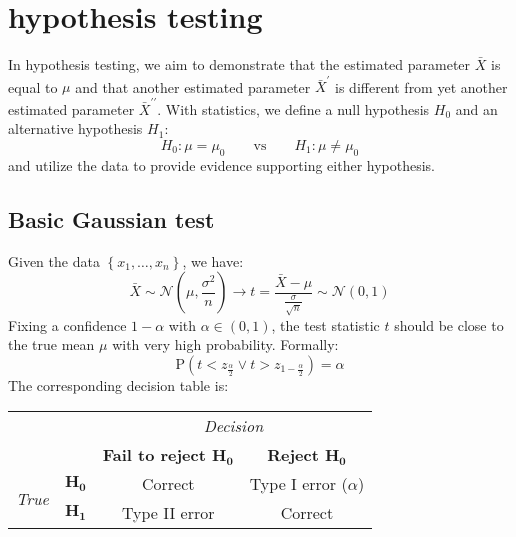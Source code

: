 \section{hypothesis testing}

In hypothesis testing, we aim to demonstrate that the estimated parameter $\bar{X}$ is equal to $\mu$ and that another estimated parameter $\bar{X}^\prime$  is different from yet another estimated parameter $\bar{X}^{\prime\prime}$. 
With statistics, we define a null hypothesis $H_0$ and an alternative hypothesis $H_1$: 
\[H_0:\mu=\mu_0 \qquad \text{vs} \qquad H_1:\mu\neq\mu_0\]
and utilize the data to provide evidence supporting either hypothesis.

\subsection{Basic Gaussian test}
Given the data $\left\{ x_1,\dots,x_n \right\}$, we have: 
\[\bar{X}\sim\mathcal{N}\left(\mu,\dfrac{\sigma^2}{n}\right)\rightarrow t=\dfrac{\bar{X}-\mu}{\frac{\sigma}{\sqrt{n}}}\sim\mathcal{N}(0,1)\]
Fixing a confidence $1-\alpha$ with $\alpha \in (0,1)$, the test statistic $t$ should be close to the true mean $\mu$ with very high probability. 
Formally:
\[\text{P}(t<z_{\frac{\alpha}{2}} \lor t> z_{1-\frac{\alpha}{2}})=\alpha\]
The corresponding decision table is:
\begin{table}[H]
    \centering
    \begin{tabular}{cccc}
                                                        &                                                       & \multicolumn{2}{c}{\textit{Decision}}                                                                                               \\ \cline{3-4} 
                                                        & \multicolumn{1}{c|}{}                                 & \multicolumn{1}{c|}{\textbf{Fail to reject $\textbf{H}_\textbf{0}$}} & \multicolumn{1}{c|}{\textbf{Reject $\textbf{H}_\textbf{0}$}} \\ \cline{2-4} 
    \multicolumn{1}{c|}{\multirow{2}{*}{\textit{True}}} & \multicolumn{1}{c|}{\textbf{$\textbf{H}_\textbf{0}$}} & \multicolumn{1}{c|}{Correct}                                         & \multicolumn{1}{c|}{Type I error ($\alpha$)}                 \\ \cline{2-4} 
    \multicolumn{1}{c|}{}                               & \multicolumn{1}{c|}{\textbf{$\textbf{H}_\textbf{1}$}} & \multicolumn{1}{c|}{Type II error}                                   & \multicolumn{1}{c|}{Correct}                                 \\ \cline{2-4} 
    \end{tabular}
\end{table}

